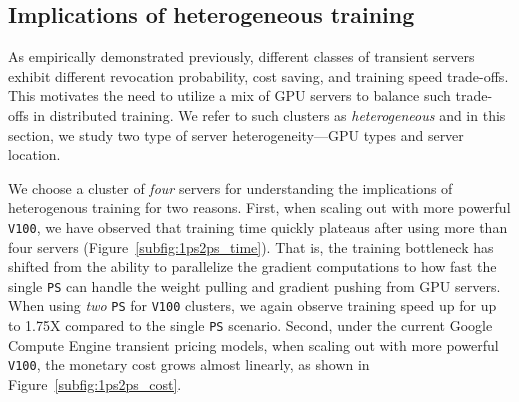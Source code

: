 \subsection{Implications of heterogeneous training}
\label{subsec:heter_train}


As empirically demonstrated previously, different classes of transient servers exhibit different
revocation probability, cost saving, and training speed trade-offs. This motivates the need to 
utilize a mix of GPU servers to balance such trade-offs in distributed training. We refer
to such clusters as \emph{heterogeneous} and in this section, we study two type of server heterogeneity---GPU types and server location.



We choose a cluster of \emph{four} servers for understanding the implications
of heterogenous training for two reasons. First, when scaling out with more powerful \texttt{V100}, we have observed 
that training time quickly plateaus after using more than four servers (Figure~\ref{subfig:1ps2ps_time}). That is, the training bottleneck has shifted from
the ability to parallelize the gradient computations to how fast the single \texttt{PS} can handle the weight pulling and gradient pushing from GPU servers. 
When using \emph{two} \texttt{PS} for \texttt{V100} clusters, we again observe training speed up for up to 1.75X compared to the single \texttt{PS} scenario. 
Second, under the current Google Compute Engine transient pricing models, when scaling out with more powerful \texttt{V100}, the monetary cost grows almost linearly, 
as shown in Figure~\ref{subfig:1ps2ps_cost}.



%

